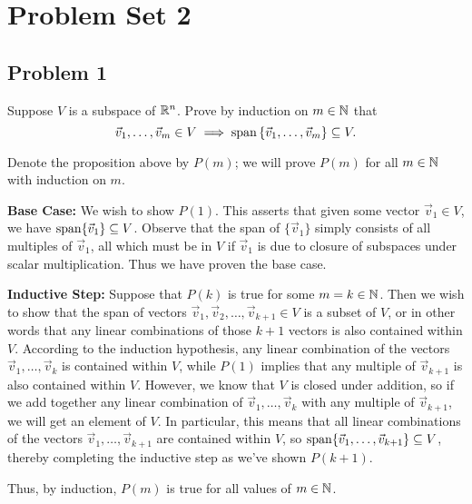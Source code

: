 \documentclass[main.tex]{subfiles}
\begin{document}
\section{Problem Set 2}
\subsection{Problem 1}
\begin{claim}
    Suppose $V$ is a subspace of $\mathbb R^n$. Prove by induction on $m \in \mathbb N$ that
    \[\vec{v}_1, \ldots , \vec{v}_m \in V \implies \operatorname{span}\left\{ \vec{v}_1, \ldots , \vec{v}_m \right\}\subseteq V.\]    
\end{claim}

\begin{soln}
    Denote the proposition above by $P(m)$; we will prove $P(m)$ for all $m\in \mathbb N$ with induction on $m$.

    \textbf{Base Case:} We wish to show $P(1)$. This asserts that given some vector $\vec{v}_{1}\in V$, we have $\operatorname{span}\{\vec{v}_{1}\} \subseteq V$. Observe that the span of $\{\vec{v}_{1}\}$ simply consists of all multiples of $\vec{v}_{1}$, all which must be in $V$ if $\vec{v}_{1}$ is due to closure of subspaces under scalar multiplication. Thus we have proven the base case.

    \textbf{Inductive Step:} Suppose that $P(k)$ is true for some $m = k\in \mathbb N$. Then we wish to show that the span of vectors $\vec{v}_{1}, \vec{v}_{2}, \ldots , \vec{v}_{k + 1}\in V$ is a subset of $V$, or in other words that any linear combinations of those $k + 1$ vectors is also contained within $V$. According to the induction hypothesis, any linear combination of the vectors $\vec{v}_{1}, \ldots , \vec{v}_{k}$ is contained within $V$, while $P(1)$ implies that any multiple of $\vec{v}_{k + 1}$ is also contained within $V$. However, we know that $V$ is closed under addition, so if we add together any linear combination of $\vec{v}_{1}, \ldots , \vec{v}_{k}$ with any multiple of $\vec{v}_{k + 1}$, we will get an element of $V$. In particular, this means that all linear combinations of the vectors $\vec{v}_{1}, \ldots , \vec{v}_{k + 1}$ are contained within $V$, so $\operatorname{span}\{\vec{v}_{1}, \ldots , \vec{v}_{k + 1}\} \subseteq V$, thereby completing the inductive step as we've shown $P(k + 1)$.
    
    Thus, by induction, $P(m)$ is true for all values of $m\in \mathbb N$.
\end{soln}
\eject
\end{document}
